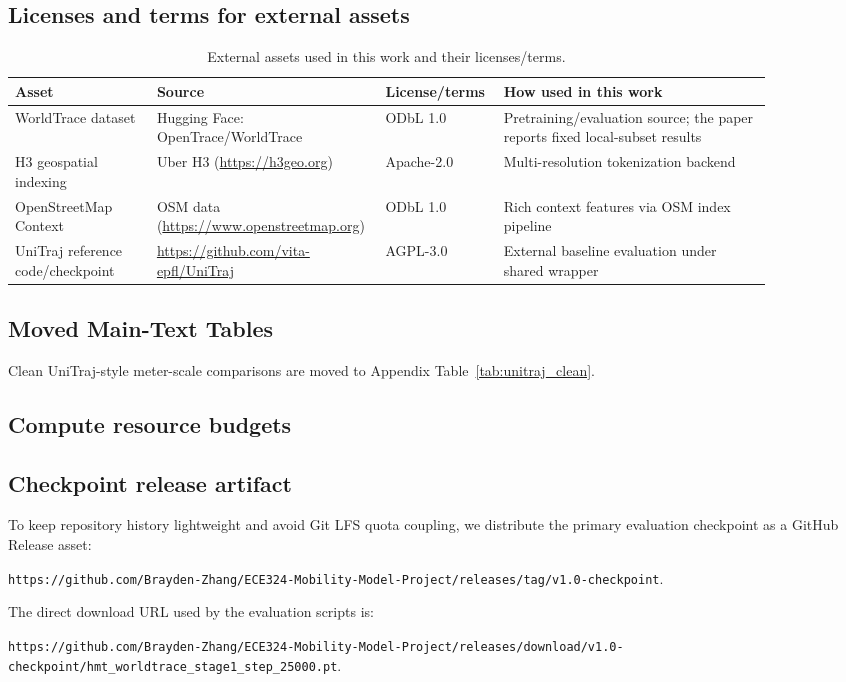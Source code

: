 \documentclass{article}
\begin{document}
\subsection{Licenses and terms for external assets}
\begin{table}[t]
\centering
\small
\setlength{\tabcolsep}{4pt}
\caption{External assets used in this work and their licenses/terms.}
\label{tab:asset_licenses}
\begin{tabular}{
    >{\raggedright\arraybackslash}p{0.18\linewidth}
    >{\raggedright\arraybackslash}p{0.21\linewidth}
    >{\raggedright\arraybackslash}p{0.15\linewidth}
    >{\raggedright\arraybackslash}p{0.34\linewidth}}
\toprule
Asset & Source & License/terms & How used in this work \\
\midrule
WorldTrace dataset & Hugging Face: OpenTrace/\allowbreak WorldTrace & ODbL 1.0 & Pretraining/evaluation source; the paper reports fixed local-subset results \\
H3 geospatial indexing & Uber H3 (\url{https://h3geo.org}) & Apache-2.0 & Multi-resolution tokenization backend \\
OpenStreetMap Context & OSM data (\url{https://www.openstreetmap.org}) & ODbL 1.0 & Rich context features via OSM index pipeline \\
UniTraj reference code/checkpoint & \url{https://github.com/vita-epfl/UniTraj} & AGPL-3.0 & External baseline evaluation under shared wrapper \\
\bottomrule
\end{tabular}
\end{table}

\subsection{Moved Main-Text Tables}
Clean UniTraj-style meter-scale comparisons are moved to Appendix Table~\ref{tab:unitraj_clean}.



\subsection{Compute resource budgets}


\subsection{Checkpoint release artifact}
To keep repository history lightweight and avoid Git LFS quota coupling, we distribute the primary evaluation checkpoint as a GitHub Release asset:
\begin{flushleft}
\footnotesize\nolinkurl{https://github.com/Brayden-Zhang/ECE324-Mobility-Model-Project/releases/tag/v1.0-checkpoint}.
\end{flushleft}
The direct download URL used by the evaluation scripts is:
\begin{flushleft}
\footnotesize\nolinkurl{https://github.com/Brayden-Zhang/ECE324-Mobility-Model-Project/releases/download/v1.0-checkpoint/hmt_worldtrace_stage1_step_25000.pt}.
\end{flushleft}
\end{document}
